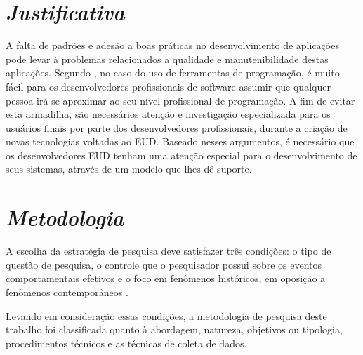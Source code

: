\section{\textit{Justificativa}}

A falta de padrões e adesão a boas práticas no desenvolvimento de aplicações pode levar à problemas relacionados a qualidade e manutenibilidade destas aplicações. Segundo \cite{blackwell2003notational}, no caso do uso de ferramentas de programação, é muito fácil para os desenvolvedores profissionais de software assumir que qualquer pessoa irá se aproximar ao seu nível profissional de programação. A fim de evitar esta armadilha, são necessários atenção e investigação especializada para os usuários finais por parte dos desenvolvedores profissionais, durante a criação de novas tecnologias voltadas ao EUD. Baseado nesses argumentos, é necessário que os desenvolvedores EUD tenham uma atenção especial para o desenvolvimento de seus sistemas, através de um modelo que lhes dê suporte.

\section{\textit{Metodologia}}

A escolha da estratégia de pesquisa deve satisfazer três condições: o tipo de questão de pesquisa, o controle que o pesquisador possui sobre os eventos comportamentais efetivos e o foco em fenômenos históricos, em oposição a fenômenos contemporâneos \cite{yin2001estudo}.

Levando em consideração essas condições, a metodologia de pesquisa deste trabalho foi classificada quanto à abordagem, natureza, objetivos ou tipologia, procedimentos técnicos e as técnicas de coleta de dados.


